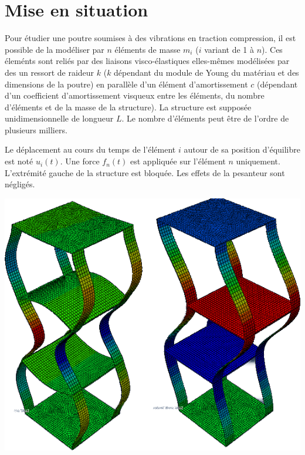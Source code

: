\documentclass[10pt]{article}
\newif\ifprof
\newif\ifxp
\begin{document}
\ifxp

\else

\fi



 \renewcommand{\baselinestretch}{1.2}
\setlength{\parskip}{2ex plus 0.5ex minus 0.2ex}



\section{Mise en situation}
\ifprof
\else
\begin{minipage}[c]{.7\linewidth}
Pour étudier une poutre soumises à des vibrations en traction compression, il est possible de la modéliser par $n$ éléments de masse $m_i$ ($i$ variant de 1 à $n$). Ces éleménts sont reliés par des liaisons visco-élastiques elles-mêmes modélisées par des un ressort de raideur $k$ ($k$ dépendant du module de Young du matériau et des dimensions de la poutre) en parallèle d'un élément d'amortissement $c$ (dépendant d'un coefficient d'amortissement visqueux entre les éléments, du nombre d'éléments et de la masse de la structure). La structure est supposée unidimensionnelle de longueur $L$. Le nombre d'éléments peut être de l'ordre de plusieurs milliers. 

Le déplacement au cours du temps de l'élément $i$ autour de sa position d'équilibre est noté $u_i(t)$. Une force $f_n(t)$ est appliquée sur l'élément $n$ uniquement. L'extrémité gauche de
la structure est bloquée. Les effets de la pesanteur sont négligés.
\end{minipage}
\begin{minipage}[c]{.27\linewidth}
\begin{center}
\includegraphics[width=.95\textwidth]{images/vibrations}
\end{center}
\end{minipage}
\end{document}
